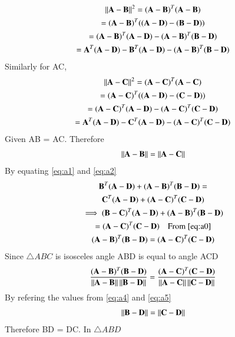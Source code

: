 \documentclass[journal,12pt,twocolumn]{IEEEtran}
\begin{document}
\begin{multline}
\norm{\vec{A-B}}^2  = (\vec{A}-\vec{B})^T(\vec{A}-\vec{B}) \\
= (\vec{A}-\vec{B})^T((\vec{A}-\vec{D})-(\vec{B}-\vec{D})) \\
= (\vec{A}-\vec{B})^T(\vec{A}-\vec{D})-(\vec{A}-\vec{B})^T(\vec{B}-\vec{D}) \\
= \vec{A}^T(\vec{A}-\vec{D})-\vec{B}^T(\vec{A}-\vec{D})-(\vec{A}-\vec{B})^T(\vec{B}-\vec{D}) 
\label{eq:a1}
\end{multline}
Similarly for AC,
\begin{multline}
\norm{\vec{A-C}}^2 = (\vec{A}-\vec{C})^T(\vec{A}-\vec{C}) \\
= (\vec{A}-\vec{C})^T((\vec{A}-\vec{D})-(\vec{C}-\vec{D})) \\
= (\vec{A}-\vec{C})^T(\vec{A}-\vec{D})-(\vec{A}-\vec{C})^T(\vec{C}-\vec{D}) \\
= \vec{A}^T(\vec{A}-\vec{D})-\vec{C}^T(\vec{A}-\vec{D})-(\vec{A}-\vec{C})^T(\vec{C}-\vec{D}) 
\label{eq:a2}
\end{multline}
Given AB = AC. Therefore
\begin{align}
\norm{\vec{A-B}} = \norm{\vec{A-C}}
\label{eq:a4}
\end{align}
By equating \eqref{eq:a1} and \eqref{eq:a2}
\begin{multline}
\vec{B}^T(\vec{A}-\vec{D})+(\vec{A}-\vec{B})^T(\vec{B}-\vec{D}) = \\ 
\vec{C}^T(\vec{A}-\vec{D})+(\vec{A}-\vec{C})^T(\vec{C}-\vec{D}) \\
\implies (\vec{B}-\vec{C})^T(\vec{A}-\vec{D})+(\vec{A}-\vec{B})^T(\vec{B}-\vec{D})  \\
= (\vec{A}-\vec{C})^T(\vec{C}-\vec{D}) \quad\text{From \eqref{eq:a0}} \\
(\vec{A}-\vec{B})^T(\vec{B}-\vec{D}) = (\vec{A}-\vec{C})^T(\vec{C}-\vec{D})
\label{eq:a5}
\end{multline}
Since $\triangle ABC$ is isosceles angle ABD is equal to angle ACD
\begin{align}
\frac{(\mathbf{A}-\mathbf{B})^T(\mathbf{B}-\mathbf{D})}{\left\lVert\mathbf{A}-\mathbf{B}\right\rVert\left\lVert\mathbf{B}-\mathbf{D}\right\rVert} =
\frac{(\mathbf{A}-\mathbf{C})^T(\mathbf{C}-\mathbf{D})}{\left\lVert\mathbf{A}-\mathbf{C}\right\rVert\left\lVert\mathbf{C}-\mathbf{D}\right\rVert} 
\end{align}
By refering the values from \ref{eq:a4} and \ref{eq:a5}
\begin{align}
\norm{\vec{B}-\vec{D}} = \norm{\vec{C}-\vec{D}}
\label{eq:a6}
\end{align}
Therefore BD = DC. In $\triangle ABD$
\end{document}
